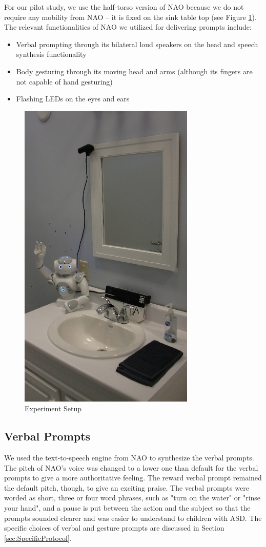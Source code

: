 \documentclass{ut-thesis}
\begin{document}
For our pilot study, we use the half-torso version of NAO because we do not require any mobility from NAO -- it is fixed on the sink table top (see Figure \ref{fig:ExpSetup}).  The relevant functionalities of NAO we utilized for delivering prompts include:
\begin{itemize}
	\item Verbal prompting through its bilateral loud speakers on the head and speech synthesis functionality
	\item Body gesturing through its moving head and arms (although its fingers are not capable of hand gesturing)
	\item Flashing LEDs on the eyes and ears
\end{itemize}
\begin{figure} [h]
	\centering
	\includegraphics[height=15cm, keepaspectratio]{./img/exp_setup.jpg}
	\caption{Experiment Setup}
	\label{fig:ExpSetup}
\end{figure}


\subsection{Verbal Prompts}
We used the text-to-speech engine from NAO to synthesize the verbal prompts.  The pitch of NAO's voice was changed to a lower one than default for the verbal prompts to give a more authoritative feeling.  The reward verbal prompt remained the default pitch, though, to give an exciting praise.  The verbal prompts were worded as short, three or four word phrases, such as "turn on the water" or "rinse your hand", and a pause is put between the action and the subject so that the prompts sounded clearer and was easier to understand to children with ASD.  The specific choices of verbal and gesture prompts are discussed in Section \ref{sec:SpecificProtocol}.
\end{document}
